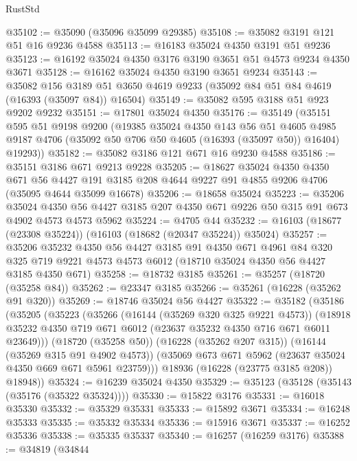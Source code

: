 \begin{lexlean}{RustStd}
\begin{coremodule}
@35102 := @35090 (@35096 @35099 @29385)
@35108 := @35082 @3191 @121 @51 @16 @9236 @4588
@35113 := @16183 @35024 @4350 @3191 @51 @9236
@35123 := @16192 @35024 @4350 @3176 @3190 @3651 @51 @4573 @9234 @4350 @3671
@35128 := @16162 @35024 @4350 @3190 @3651 @9234
@35143 := @35082
    @156
    @3189
    @51
    @3650
    @4619
    @9233
    (@35092 @84 @51 @84 @4619 (@16393 (@35097 @84)) @16504)
@35149 := @35082 @595 @3188 @51 @923 @9202 @9232
@35151 := @17801 @35024 @4350
@35176 := @35149
    (@35151
      @595
      @51
      @9198
      @9200
      (@19385
        @35024
        @4350
        @143
        @56
        @51
        @4605
        @4985
        @9187
        @4706
        (@35092 @50 @706 @50 @4605 (@16393 (@35097 @50)) @16404)
        @19293))
@35182 := @35082 @3186 @121 @671 @16 @9230 @4588
@35186 := @35151 @3186 @671 @9213 @9228
@35205 := @18627
    @35024
    @4350
    @4350
    @671
    @56
    @4427
    @191
    @3185
    @208
    @4644
    @9227
    @91
    @4855
    @9206
    @4706
    (@35095 @4644 @35099 @16678)
@35206 := @18658 @35024
@35223 := @35206
    @35024
    @4350
    @56
    @4427
    @3185
    @207
    @4350
    @671
    @9226
    @50
    @315
    @91
    @673
    @4902
    @4573
    @4573
    @5962
@35224 := @4705 @44
@35232 := @16103 (@18677 (@23308 @35224)) (@16103 (@18682 (@20347 @35224)) @35024)
@35257 := @35206
    @35232
    @4350
    @56
    @4427
    @3185
    @91
    @4350
    @671
    @4961
    @84
    @320
    @325
    @719
    @9221
    @4573
    @4573
    @6012
    (@18710 @35024 @4350 @56 @4427 @3185 @4350 @671)
@35258 := @18732 @3185
@35261 := @35257 (@18720 (@35258 @84))
@35262 := @23347 @3185
@35266 := @35261 (@16228 (@35262 @91 @320))
@35269 := @18746 @35024 @56 @4427
@35322 := @35182
    (@35186
      (@35205
        (@35223
          (@35266
            (@16144 (@35269 @320 @325 @9221 @4573))
            (@18918 @35232 @4350 @719 @671 @6012 (@23637 @35232 @4350 @716 @671 @6011 @23649)))
          (@18720 (@35258 @50))
          (@16228 (@35262 @207 @315))
          (@16144 (@35269 @315 @91 @4902 @4573))
          (@35069 @673 @671 @5962 (@23637 @35024 @4350 @669 @671 @5961 @23759)))
        @18936
        (@16228 (@23775 @3185 @208))
        @18948))
@35324 := @16239 @35024 @4350
@35329 := @35123 (@35128 (@35143 (@35176 (@35322 @35324))))
@35330 := @15822 @3176
@35331 := @16018 @35330
@35332 := @35329 @35331
@35333 := @15892 @3671
@35334 := @16248 @35333
@35335 := @35332 @35334
@35336 := @15916 @3671
@35337 := @16252 @35336
@35338 := @35335 @35337
@35340 := @16257 (@16259 @3176)
@35388 := @34819
    (@34844

\end{coremodule}
\end{lexlean}
